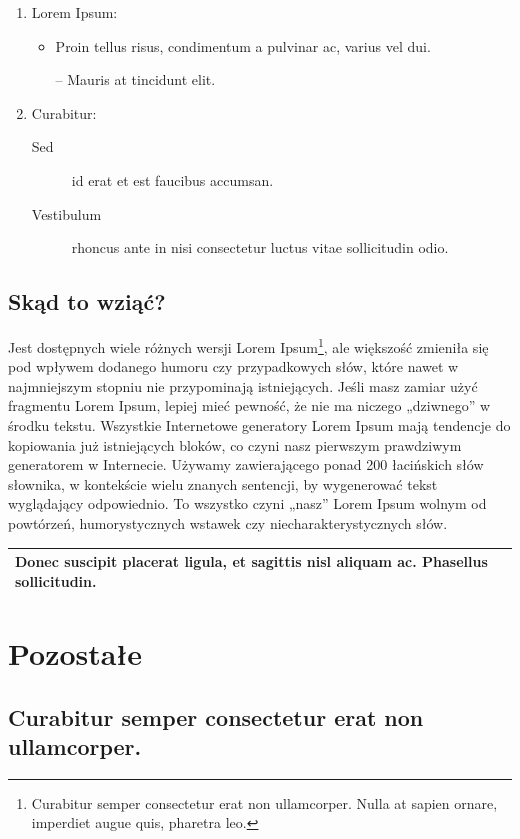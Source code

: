 \documentclass[a4paper,12pt]{article}
\begin{document}
\begin{enumerate}
\item Lorem Ipsum:
\begin{itemize}
\item  Proin tellus risus, condimentum a pulvinar ac, varius vel dui.
\item[--] Mauris at tincidunt elit. 
\end{itemize}
\item Curabitur:
\begin{description}
\item[Sed] id erat et est faucibus accumsan.
\item[Vestibulum] rhoncus ante in nisi consectetur luctus vitae sollicitudin odio.
\end{description}
\end{enumerate}

\subsection{Skąd to wziąć?}

Jest dostępnych wiele różnych wersji Lorem Ipsum\footnote{Curabitur semper consectetur erat non ullamcorper. Nulla at sapien ornare, imperdiet augue quis, pharetra leo.}, ale większość zmieniła się pod wpływem dodanego humoru czy przypadkowych słów, które nawet w najmniejszym stopniu nie przypominają istniejących. Jeśli masz zamiar użyć fragmentu Lorem Ipsum, lepiej mieć pewność, że nie ma niczego „dziwnego” w środku tekstu. Wszystkie Internetowe generatory Lorem Ipsum mają tendencje do kopiowania już istniejących bloków, co czyni nasz pierwszym prawdziwym generatorem w Internecie. Używamy zawierającego ponad 200 łacińskich słów słownika, w kontekście wielu znanych sentencji, by wygenerować tekst wyglądający odpowiednio. To wszystko czyni „nasz” Lorem Ipsum wolnym od powtórzeń, humorystycznych wstawek czy niecharakterystycznych słów.

\begin{tabular}{|p{4.7cm}|} \hline
Donec suscipit placerat ligula, et sagittis nisl aliquam ac. Phasellus sollicitudin.\\ \hline
\end{tabular}

\section{Pozostałe}

\subsection{Curabitur semper consectetur erat non ullamcorper.}
\end{document}
